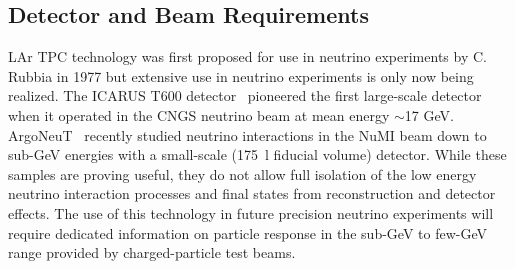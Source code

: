 \subsection{Detector and Beam Requirements }
\label{detbeam_main}

LAr TPC technology was first proposed for use in neutrino experiments by C. Rubbia in 1977
\cite{CRubbia} but extensive use in neutrino experiments is only now being realized. 
The ICARUS T600 detector~\cite{icarus_mainref} pioneered the first large-scale detector when it operated in the CNGS 
neutrino beam at mean energy $\sim$17 GeV. ArgoNeuT~\cite{argoneut1}\cite{argoneut2} recently studied 
neutrino interactions in the NuMI beam down to sub-GeV energies with a small-scale (175~l fiducial volume) detector. 
While these samples are proving useful, they do not allow full isolation of
the low energy neutrino interaction processes
and final states from reconstruction and detector effects. 
The use of this technology in future precision neutrino experiments will require dedicated 
information on particle response
in the sub-GeV to few-GeV range provided by charged-particle test beams. 

